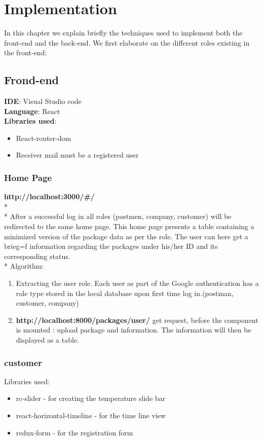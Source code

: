 \chapter{Implementation}
\label{cha:implementation}

In this chapter we explain briefly the techniques used to implement both the front-end and the back-end.
We first elaborate on the different roles existing in the front-end:

\section{Frond-end}

\textbf{IDE}: Visual Studio code\\
\textbf{Language}: React\\
\textbf{Libraries used}:
\begin{itemize}
    \item React-router-dom
    \item Receiver mail must be a registered user
\end{itemize}


\subsection{Home Page}
\textbf{http://localhost:3000/\#/}\\*
\\*
After a successful log in all roles (postmen, company, customer) will be redirected to the same home page.
This home page presents a table containing a minimized version of the package data as per the role.
The user can here get a brieg=f information regarding the packages under his/her ID and its corresponding status.\\*
Algorithm:
\begin{enumerate}
    \item Extracting the user role. Each user as part of the Google authentication has a role type stored in the local database upon first time log in.(postman, customer, company) 
    \item \textbf{http://localhost:8000/packages/user/}  get request, before the component is mounted : upload package and information. The information will then be displayed as a table.
\end{enumerate}



\subsection{customer}
Libraries used:
\begin{itemize}
\item rc-slider - for creating the temperature slide bar 
\item react-horizontal-timeline - for the time line view
\item redux-form - for the registration form
\end{itemize}

